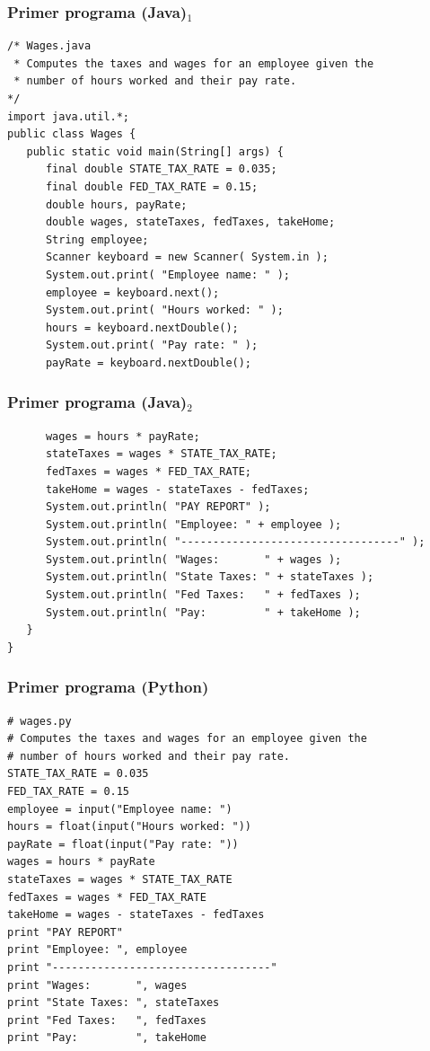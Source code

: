 \documentclass[compress]{beamer}
\begin{document}
\begin{frame}[fragile]
\frametitle{Primer programa (Java)$_1$}
\begin{verbatim}
/* Wages.java
 * Computes the taxes and wages for an employee given the
 * number of hours worked and their pay rate.
*/
import java.util.*;
public class Wages {
   public static void main(String[] args) {
      final double STATE_TAX_RATE = 0.035;
      final double FED_TAX_RATE = 0.15;
      double hours, payRate;
      double wages, stateTaxes, fedTaxes, takeHome;
      String employee;
      Scanner keyboard = new Scanner( System.in );
      System.out.print( "Employee name: " );
      employee = keyboard.next();
      System.out.print( "Hours worked: " );
      hours = keyboard.nextDouble();
      System.out.print( "Pay rate: " );
      payRate = keyboard.nextDouble();
\end{verbatim}
\end{frame}

\begin{frame}[fragile]
\frametitle{Primer programa (Java)$_2$}
\begin{verbatim}
      wages = hours * payRate;
      stateTaxes = wages * STATE_TAX_RATE;
      fedTaxes = wages * FED_TAX_RATE;
      takeHome = wages - stateTaxes - fedTaxes;
      System.out.println( "PAY REPORT" );
      System.out.println( "Employee: " + employee );
      System.out.println( "----------------------------------" );
      System.out.println( "Wages:       " + wages );
      System.out.println( "State Taxes: " + stateTaxes );
      System.out.println( "Fed Taxes:   " + fedTaxes );
      System.out.println( "Pay:         " + takeHome );
   }
}
\end{verbatim}
\end{frame}

\begin{frame}[fragile]
\frametitle{Primer programa (Python)}
\begin{verbatim}
# wages.py
# Computes the taxes and wages for an employee given the
# number of hours worked and their pay rate.
STATE_TAX_RATE = 0.035
FED_TAX_RATE = 0.15
employee = input("Employee name: ")
hours = float(input("Hours worked: "))
payRate = float(input("Pay rate: "))
wages = hours * payRate
stateTaxes = wages * STATE_TAX_RATE
fedTaxes = wages * FED_TAX_RATE
takeHome = wages - stateTaxes - fedTaxes
print "PAY REPORT"
print "Employee: ", employee
print "----------------------------------"
print "Wages:       ", wages
print "State Taxes: ", stateTaxes
print "Fed Taxes:   ", fedTaxes
print "Pay:         ", takeHome
\end{verbatim}
\end{frame}
\end{document}
